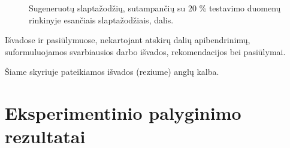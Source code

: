 \documentclass{VUMIFInfBakalaurinis}
\begin{document}
\begin{figure}[!ht]
  \begin{center}
  \end{center}
  \caption{
    Sugeneruotų slaptažodžių, sutampančių su 20 \% testavimo duomenų rinkinyje 
    esančiais slaptažodžiais, dalis.
  }
  \label{plot:kazkoks}
\end{figure}

Išvadose ir pasiūlymuose, nekartojant atskirų dalių apibendrinimų,
suformuluojamos svarbiausios darbo išvados, rekomendacijos bei pasiūlymai.

Šiame skyriuje pateikiamos išvados (reziume) anglų kalba.

\printbibliography[heading=bibintoc]

\appendix  %


\section{Eksperimentinio palyginimo rezultatai}
\end{document}
